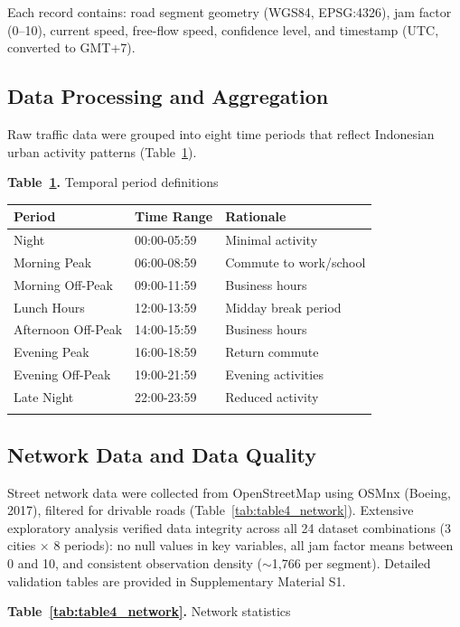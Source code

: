 \documentclass[12pt,a4paper]{article}
\begin{document}
Each record contains: road segment geometry (WGS84, EPSG:4326), jam factor (0--10), current speed, free-flow speed, confidence level, and timestamp (UTC, converted to GMT+7).

\subsection{Data Processing and Aggregation}

Raw traffic data were grouped into eight time periods that reflect Indonesian urban activity patterns (Table~\ref{tab:table3_temporal}).

\textbf{Table~\ref{tab:table3_temporal}.} Temporal period definitions

\begin{longtable}[]{@{}lll@{}}
\toprule\noalign{}
Period & Time Range & Rationale \\
\midrule\noalign{}
\endhead
\bottomrule\noalign{}
\endlastfoot
Night & 00:00-05:59 & Minimal activity \\
Morning Peak & 06:00-08:59 & Commute to work/school \\
Morning Off-Peak & 09:00-11:59 & Business hours \\
Lunch Hours & 12:00-13:59 & Midday break period \\
Afternoon Off-Peak & 14:00-15:59 & Business hours \\
Evening Peak & 16:00-18:59 & Return commute \\
Evening Off-Peak & 19:00-21:59 & Evening activities \\
Late Night & 22:00-23:59 & Reduced activity \\
\label{tab:table3_temporal}
\end{longtable}

\subsection{Network Data and Data Quality}

Street network data were collected from OpenStreetMap using OSMnx (Boeing, 2017), filtered for drivable roads (Table~\ref{tab:table4_network}). Extensive exploratory analysis verified data integrity across all 24 dataset combinations  (3 cities $\times$ 8 periods): no null values in key variables, all jam factor means between 0 and 10, and consistent observation density ($\sim$1,766 per segment). Detailed validation tables are provided in Supplementary Material S1.

\textbf{Table~\ref{tab:table4_network}.} Network statistics
\end{document}
